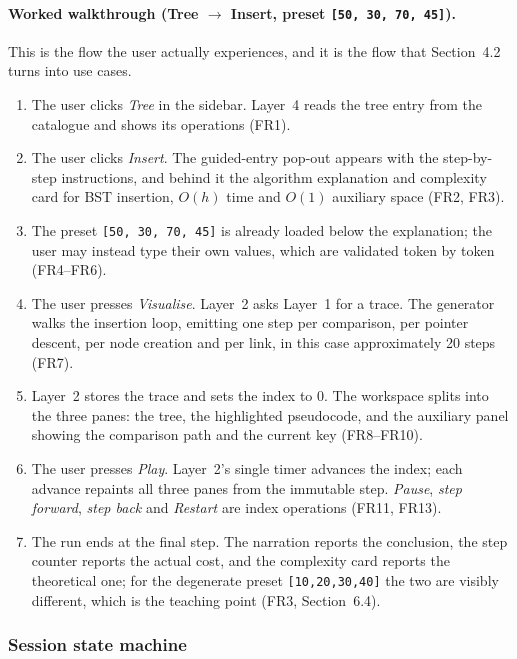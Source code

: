 \documentclass[11pt,a4paper]{article}
\newcommand{\ct}[1]{\texttt{#1}}
\begin{document}
\paragraph{Worked walkthrough (Tree $\rightarrow$ Insert, preset \ct{[50, 30, 70, 45]}).}
This is the flow the user actually experiences, and it is the flow that Section~4.2 turns
into use cases.
\begin{enumerate}[leftmargin=1.6em,itemsep=2pt]
  \item The user clicks \emph{Tree} in the sidebar. Layer~4 reads the tree entry from the
        catalogue and shows its operations (FR1).
  \item The user clicks \emph{Insert}. The guided-entry pop-out appears with the
        step-by-step instructions, and behind it the algorithm explanation and complexity
        card for BST insertion, $O(h)$ time and $O(1)$ auxiliary space (FR2, FR3).
  \item The preset \ct{[50, 30, 70, 45]} is already loaded below the explanation; the user
        may instead type their own values, which are validated token by token (FR4--FR6).
  \item The user presses \emph{Visualise}. Layer~2 asks Layer~1 for a trace. The generator
        walks the insertion loop, emitting one step per comparison, per pointer descent,
        per node creation and per link, in this case approximately 20 steps (FR7).
  \item Layer~2 stores the trace and sets the index to 0. The workspace splits into the
        three panes: the tree, the highlighted pseudocode, and the auxiliary panel showing
        the comparison path and the current key (FR8--FR10).
  \item The user presses \emph{Play}. Layer~2's single timer advances the index; each
        advance repaints all three panes from the immutable step. \emph{Pause},
        \emph{step forward}, \emph{step back} and \emph{Restart} are index operations
        (FR11, FR13).
  \item The run ends at the final step. The narration reports the conclusion, the step
        counter reports the actual cost, and the complexity card reports the theoretical
        one; for the degenerate preset \ct{[10,20,30,40]} the two are visibly different,
        which is the teaching point (FR3, Section~6.4).
\end{enumerate}

\subsubsection{Session state machine}
\end{document}
